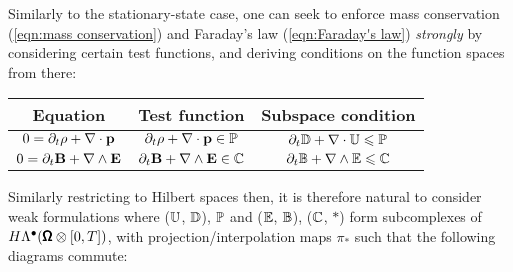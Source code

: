     Similarly to the stationary-state case, one can seek to enforce mass conservation (\ref{eqn:mass conservation}) and Faraday's law (\ref{eqn:Faraday's law}) \emph{strongly} by considering certain test functions, and deriving conditions on the function spaces from there:
    \begin{center}\begin{tabular}{ c | c | c }
        Equation  &  Test function  &  Subspace condition  \\
        \hline\hline
        $0  =  \partial_{t}\rho + \nabla\cdot\mathbf{p}$  &  $\partial_{t}\rho + \nabla\cdot\mathbf{p}  \in  \mathbb{P}$  &  $\partial_{t}\mathbb{D} + \nabla\cdot\mathbb{U}  \leqslant  \mathbb{P}$  \\
        $0  =  \partial_{t}\mathbf{B} + \nabla\wedge\mathbf{E}$  &  $\partial_{t}\mathbf{B} + \nabla\wedge\mathbf{E}  \in  \mathbb{C}$  &  $\partial_{t}\mathbb{B} + \nabla\wedge\mathbb{E}  \leqslant  \mathbb{C}$
    \end{tabular}\end{center}
    Similarly restricting to Hilbert spaces then, it is therefore natural to consider weak formulations where ($\mathbb{U}$, $\mathbb{D}$), $\mathbb{P}$ and ($\mathbb{E}$, $\mathbb{B}$), ($\mathbb{C}$, $*$) form subcomplexes of $H\Lambda^{\bullet}(\pmb{\mathsf{\Omega}}\otimes[0, T])$, with projection/interpolation maps $\pi_{*}$ such that the following diagrams commute:
    \begin{center}\end{center}

